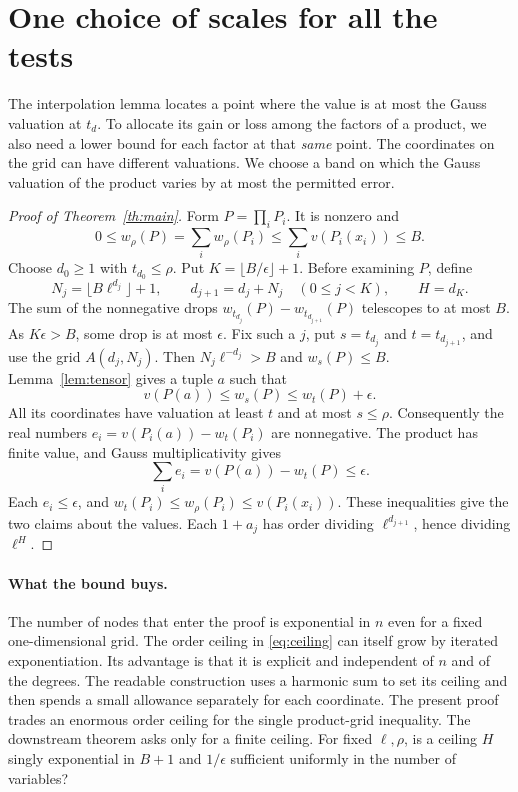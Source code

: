 \documentclass[11pt]{article}
\begin{document}
\section{One choice of scales for all the tests}\label{sec:bands}
The interpolation lemma locates a point where the value is at most the Gauss valuation at $t_d$. To allocate its gain or loss among the factors of a product, we also need a lower bound for each factor at that \emph{same} point. The coordinates on the grid can have different valuations. We choose a band on which the Gauss valuation of the product varies by at most the permitted error.
\begin{proof}[Proof of Theorem~\ref{th:main}]
Form $P=\prod_i P_i$. It is nonzero and
\[
       0\le w_\rho(P)=\sum_i w_\rho(P_i)\le\sum_i v(P_i(x_i))\le B .
\]
Choose $d_0\ge1$ with $t_{d_0}\le\rho$. Put $K=\lfloor B/\epsilon\rfloor+1$. Before examining $P$, define
\begin{equation}
     N_j=\lfloor B\ell^{d_j}\rfloor+1,\qquad
     d_{j+1}=d_j+N_j\quad(0\le j<K),\qquad H=d_K .
     \label{eq:ceiling}
\end{equation}
The sum of the nonnegative drops $w_{t_{d_j}}(P)-w_{t_{d_{j+1}}}(P)$ telescopes to at most $B$. As $K\epsilon>B$, some drop is at most $\epsilon$. Fix such a $j$, put $s=t_{d_j}$ and $t=t_{d_{j+1}}$, and use the grid $A(d_j,N_j)$. Then $N_j\ell^{-d_j}>B$ and $w_s(P)\le B$. Lemma~\ref{lem:tensor} gives a tuple $a$ such that
\[
             v(P(a))\le w_s(P)\le w_t(P)+\epsilon .
\]
All its coordinates have valuation at least $t$ and at most $s\le\rho$. Consequently the real numbers $e_i=v(P_i(a))-w_t(P_i)$ are nonnegative. The product has finite value, and Gauss multiplicativity gives
\[
       \sum_i e_i = v(P(a))-w_t(P)\le\epsilon .
\]
Each $e_i\le\epsilon$, and $w_t(P_i)\le w_\rho(P_i)\le v(P_i(x_i))$. These inequalities give the two claims about the values. Each $1+a_j$ has order dividing $\ell^{d_{j+1}}$, hence dividing $\ell^H$.
\end{proof}

\paragraph{What the bound buys.} The number of nodes that enter the proof is exponential in $n$ even for a fixed one-dimensional grid. The order ceiling in \eqref{eq:ceiling} can itself grow by iterated exponentiation. Its advantage is that it is explicit and independent of $n$ and of the degrees. The readable construction uses a harmonic sum to set its ceiling and then spends a small allowance separately for each coordinate. The present proof trades an enormous order ceiling for the single product-grid inequality. The downstream theorem asks only for a finite ceiling. For fixed $\ell,\rho$, is a ceiling $H$ singly exponential in $B+1$ and $1/\epsilon$ sufficient uniformly in the number of variables?
\end{document}
